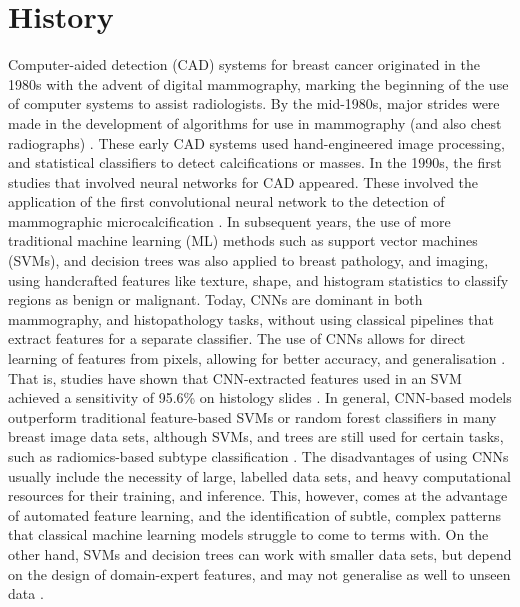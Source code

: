 \documentclass[../main]{subfiles}
\begin{document}
\section{History}
\label{sec:history}
Computer-aided detection (CAD) systems for breast cancer originated in the 1980s with the advent of digital mammography, marking the beginning of the use of computer systems to assist radiologists. By the mid-1980s, major strides were made in the development of algorithms for use in mammography (and also chest radiographs) \autocite{https://doi.org/10.1118/1.3013555}. These early CAD systems used hand-engineered image processing, and statistical classifiers to detect calcifications or masses. In the 1990s, the first studies that involved neural networks for CAD appeared. These involved the application of the first convolutional neural network to the detection of mammographic microcalcification \autocite{https://doi.org/10.1118/1.3013555}. In subsequent years, the use of more traditional machine learning (ML) methods such as support vector machines (SVMs), and decision trees was also applied to breast pathology, and imaging, using handcrafted features like texture, shape, and histogram statistics to classify regions as benign or malignant. Today, CNNs are dominant in both mammography, and histopathology tasks, without using classical pipelines that extract features for a separate classifier. The use of CNNs allows for direct learning of features from pixels, allowing for better accuracy, and generalisation \autocite{araujo2017classification}. That is, studies have shown that CNN-extracted features used in an SVM achieved a sensitivity of 95.6\% on histology slides \autocite{araujo2017classification}. In general, CNN-based models outperform traditional feature-based SVMs or random forest classifiers in many breast image data sets, although SVMs, and trees are still used for certain tasks, such as radiomics-based subtype classification \autocite{guo2024machine}. The disadvantages of using CNNs usually include the necessity of large, labelled data sets, and heavy computational resources for their training, and inference. This, however, comes at the advantage of automated feature learning, and the identification of subtle, complex patterns that classical machine learning models struggle to come to terms with. On the other hand, SVMs and decision trees can work with smaller data sets, but depend on the design of domain-expert features, and may not generalise as well to unseen data \autocite{araujo2017classification}.
\end{document}
